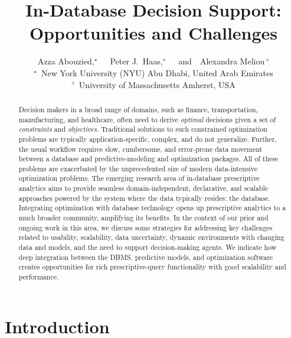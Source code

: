 \documentclass[11pt]{article}
\begin{document}
    \title{In-Database Decision Support: Opportunities and Challenges}
    \author{Azza Abouzied,$^{\star}$~~~Peter J.~Haas,$^{\diamond}$~~~and~~Alexandra Meliou$\,^{\diamond}$\\
    $^{\star}$~New York University (NYU) Abu Dhabi, United Arab Emirates\\
    $^{\diamond}$~University of Massachusetts Amherst, USA}

    \maketitle
    
\begin{abstract}
    Decision makers in a broad range of domains, such as finance, transportation, manufacturing, and healthcare, often need to derive \emph{optimal} decisions given a set of \emph{constraints} and \emph{objectives}. Traditional solutions to such constrained optimization problems are typically application-specific, complex, and do not generalize. Further, the usual workflow requires slow, cumbersome, and error-prone data movement between a database and predictive-modeling and optimization packages. All of these problems are exacerbated by the unprecedented size of modern data-intensive optimization problems. The emerging research area of in-database prescriptive analytics aims to provide seamless domain-independent, declarative, and scalable approaches powered by the system where the data typically resides: the database. Integrating optimization with database technology opens up  prescriptive analytics to a much broader community, amplifying its benefits. In the context of our prior and ongoing work in this area, we discuss some strategies for addressing key challenges related to usability, scalability, data uncertainty, dynamic environments with changing data and models, and the need to support decision-making agents. We indicate how deep integration between the DBMS, predictive models, and optimization software creates opportunities for rich prescriptive-query functionality with good scalability and performance.
\end{abstract} 


\section{Introduction}
\label{sec:introduction}
    
\end{document}
